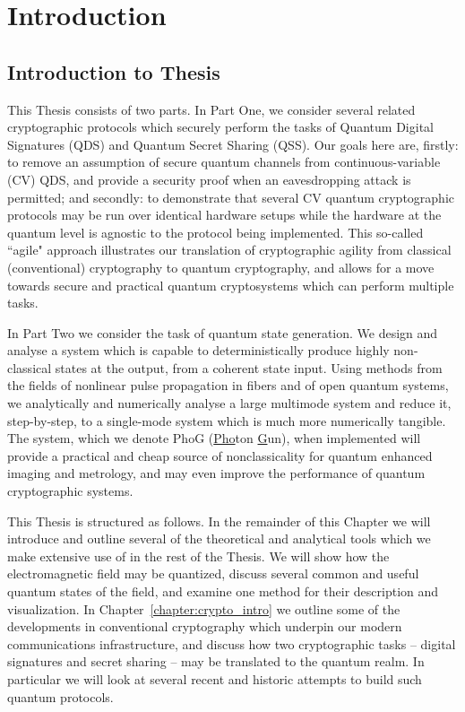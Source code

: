 \chapter{Introduction}


\section{Introduction to Thesis}

This Thesis consists of two parts. In Part One, we consider several related cryptographic protocols which securely perform the tasks of Quantum Digital Signatures (QDS) and Quantum Secret Sharing (QSS). Our goals here are, firstly: to remove an assumption of secure quantum channels from continuous-variable (CV) QDS, and provide a security proof when an eavesdropping attack is permitted; and secondly: to demonstrate that several CV quantum cryptographic protocols may be run over identical hardware setups while the hardware at the quantum level is agnostic to the protocol being implemented. This so-called ``agile" approach illustrates our translation of cryptographic agility from classical (conventional) cryptography to quantum cryptography, and allows for a move towards secure and practical quantum cryptosystems which can perform multiple tasks.

In Part Two we consider the task of quantum state generation. We design and analyse a system which is capable to deterministically produce highly non-classical states at the output, from a coherent state input. Using methods from the fields of nonlinear pulse propagation in fibers and of open quantum systems, we analytically and numerically analyse a large multimode system and reduce it, step-by-step, to a single-mode system which is much more numerically tangible. The system, which we denote PhoG (\underline{Pho}ton \underline{G}un), when implemented will provide a practical and cheap source of nonclassicality for quantum enhanced imaging and metrology, and may even improve the performance of quantum cryptographic systems.

This Thesis is structured as follows. In the remainder of this Chapter we will introduce and outline several of the theoretical and analytical tools which we make extensive use of in the rest of the Thesis. We will show how the electromagnetic field may be quantized, discuss several common and useful quantum states of the field, and examine one method for their description and visualization. In Chapter~\ref{chapter:crypto_intro} we outline some of the developments in conventional cryptography which underpin our modern communications infrastructure, and discuss how two cryptographic tasks -- digital signatures and secret sharing -- may be translated to the quantum realm. In particular we will look at several recent and historic attempts to build such quantum protocols.

